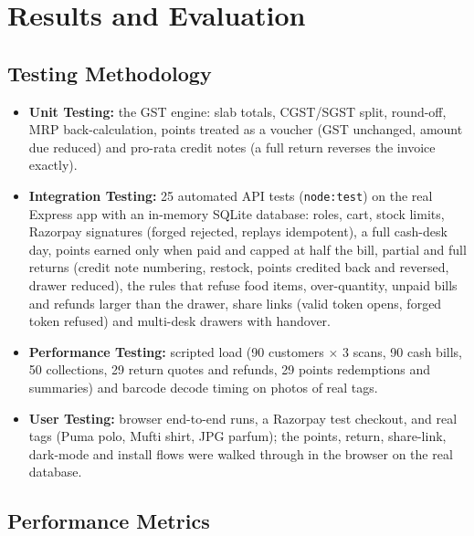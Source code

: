 \documentclass[12pt,letterpaper,twoside,openany]{report}
\begin{document}
\chapter{Results and Evaluation}

\section{Testing Methodology}
\begin{itemize}[leftmargin=*]
  \item \textbf{Unit Testing:} the GST engine: slab totals, CGST/SGST split, round-off,
        MRP back-calculation, points treated as a voucher (GST unchanged, amount due
        reduced) and pro-rata credit notes (a full return reverses the invoice exactly).
  \item \textbf{Integration Testing:} 25 automated API tests (\texttt{node:test}) on the real
        Express app with an in-memory SQLite database: roles, cart, stock limits, Razorpay
        signatures (forged rejected, replays idempotent), a full cash-desk day, points earned
        only when paid and capped at half the bill, partial and full returns (credit note
        numbering, restock, points credited back and reversed, drawer reduced), the rules that
        refuse food items, over-quantity, unpaid bills and refunds larger than the drawer,
        share links (valid token opens, forged token refused) and multi-desk drawers with
        handover.
  \item \textbf{Performance Testing:} scripted load (90 customers $\times$ 3 scans, 90 cash
        bills, 50 collections, 29 return quotes and refunds, 29 points redemptions and
        summaries) and barcode decode timing on photos of real tags.
  \item \textbf{User Testing:} browser end-to-end runs, a Razorpay test checkout, and real
        tags (Puma polo, Mufti shirt, JPG parfum); the points, return, share-link, dark-mode
        and install flows were walked through in the browser on the real database.
\end{itemize}

\section{Performance Metrics}
\end{document}
